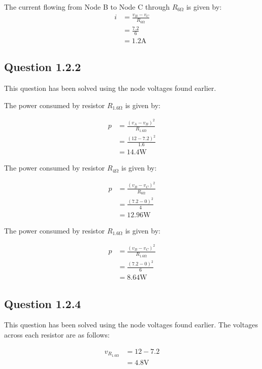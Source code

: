 \documentclass[paper=a4, fontsize=11pt]{scrartcl} %
\numberwithin{equation}{section} %
\numberwithin{figure}{section} %
\numberwithin{table}{section} %
\begin{document}
The current flowing from Node B to Node C through $R_{6 \si{\ohm}}$ is given by:
\begin{align*}
i &= \frac{v_{B} - v_{C}}{R_{6 \si{\ohm}}} \\
&= \frac{7.2}{6} \\
&= 1.2 \si{\ampere}
\end{align*}

\subsection*{Question 1.2.2}

This question has been solved using the node voltages found earlier.

The power consumed by resistor $R_{1.6 \si{\ohm}}$ is given by:

\begin{align*}
p &= \frac{(v_{A} - v_{B})^2}{R_{1.6\si{\ohm}}} \\
&= \frac{(12 - 7.2)^2}{1.6} \\
&= 14.4 \si{\watt}
\end{align*}

The power consumed by resistor $R_{4 \si{\ohm}}$ is given by:

\begin{align*}
p &= \frac{(v_{B} - v_{C})^2}{R_{6\si{\ohm}}} \\
&= \frac{(7.2 - 0)^2}{4} \\
&= 12.96 \si{\watt}
\end{align*}

The power consumed by resistor $R_{1.6 \si{\ohm}}$ is given by:

\begin{align*}
p &= \frac{(v_{B} - v_{C})^2}{R_{1.6\si{\ohm}}} \\
&= \frac{(7.2 - 0)^2}{6} \\
&= 8.64 \si{\watt}
\end{align*}

\subsection*{Question 1.2.4}
This question has been solved using the node voltages found earlier.
The voltages across each resistor are as follows:

\begin{align*}
v_{R_{1.6\si{\ohm}}} &= 12 - 7.2 \\
&= 4.8\si{\volt}
\end{align*}
\end{document}

